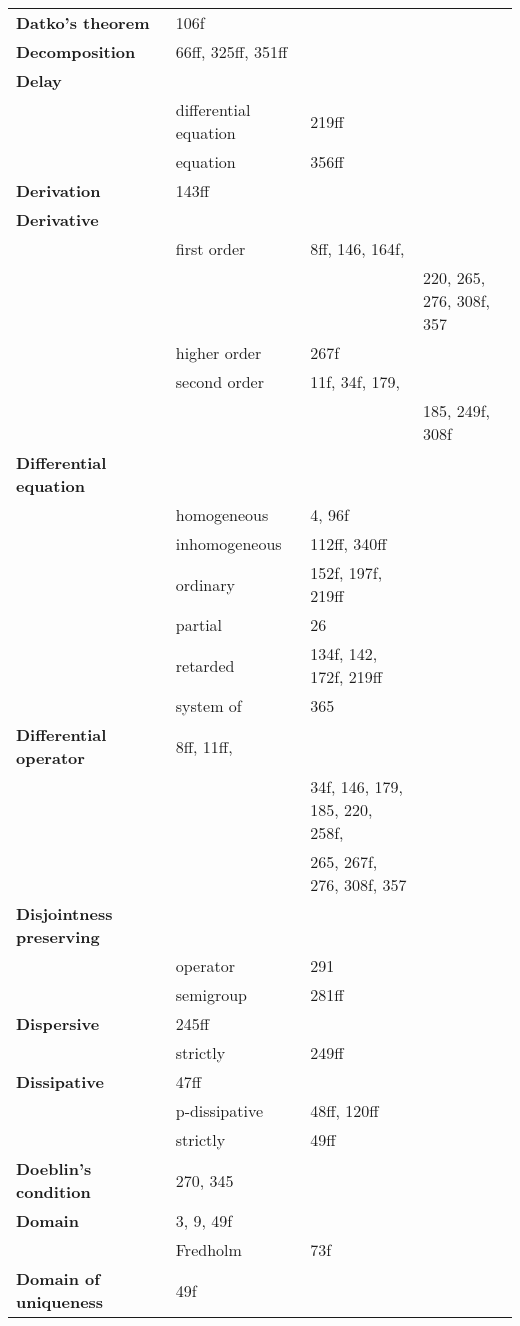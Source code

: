\documentclass[10pt]{scrartcl}
\begin{document}
\begin{longtable}{>{\bfseries}p{4cm}p{4cm}p{4cm}p{4cm}}
Datko's theorem & 106f \\
Decomposition & 66ff, 325ff, 351ff \\
Delay & \\
& differential equation & 219ff \\
& equation & 356ff \\
Derivation & 143ff \\
Derivative & \\
& first order & 8ff, 146, 164f, \\
& & & 220, 265, 276, 308f, 357 \\
& higher order & 267f \\
& second order & 11f, 34f, 179, \\
& & & 185, 249f, 308f \\
Differential equation & \\
& homogeneous & 4, 96f \\
& inhomogeneous & 112ff, 340ff \\
& ordinary & 152f, 197f, 219ff \\
& partial & 26 \\
& retarded & 134f, 142, 172f, 219ff \\
& system of & 365 \\
Differential operator & 8ff, 11ff, \\
& & 34f, 146, 179, 185, 220, 258f, \\
& & 265, 267f, 276, 308f, 357 \\
Disjointness preserving & \\
& operator & 291 \\
& semigroup & 281ff \\
Dispersive & 245ff \\
& strictly & 249ff \\
Dissipative & 47ff \\
& p-dissipative & 48ff, 120ff \\
& strictly & 49ff \\
Doeblin's condition & 270, 345 \\
Domain & 3, 9, 49f \\
& Fredholm & 73f \\
Domain of uniqueness & 49f \\

\end{longtable}
\end{document}
